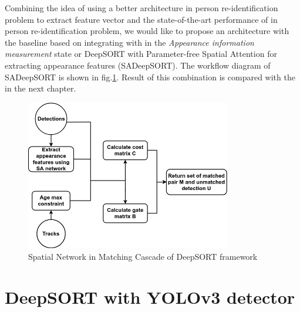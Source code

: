 Combining the idea of using a better architecture in person re-identification problem to extract feature vector and the state-of-the-art performance of
\cite{SA} in person re-identification problem, we would like to propose an architecture with the baseline based on \cite{Wojke2017simple} integrating with \cite{SA}
in the \textit{Appearance information measurement} state or DeepSORT with Parameter-free Spatial Attention for extracting appearance features (SADeepSORT). The workflow diagram of SADeepSORT is shown
in fig.\ref{fig:sa_matching}. Result of this combination is compared with the \cite{Wojke2017simple} in the next chapter. 
\begin{figure}[h!]
    \centering
    \includegraphics[width=0.8\textwidth]{Chapters/Fig/Thesis_diagram-SA_Matching_Cascade.png}
    \caption{Spatial Network in Matching Cascade of DeepSORT framework}
    \label{fig:sa_matching}
\end{figure}

\pagebreak
\section{DeepSORT with YOLOv3 detector}

